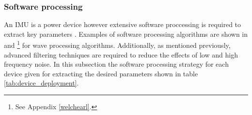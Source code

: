 \subsubsection{Software processing}

An IMU is a power device however extensive software proccessing is required to extract key parameters \cite{ahmad2013reviews}. Examples of software processing algorithms are shown in \textcite{kuik1988method} and \textcite{earle1996nondirectional}\footnote{See Appendix \ref{welchearl}.} for wave processing algorithms. Additionally, as mentioned previously, advanced filtering techniques are required to reduce the effects of low and high frequency noise. In this subsection the software processing strategy for each device given for extracting the desired parameters shown in table \ref{tab:device_deployment}.

